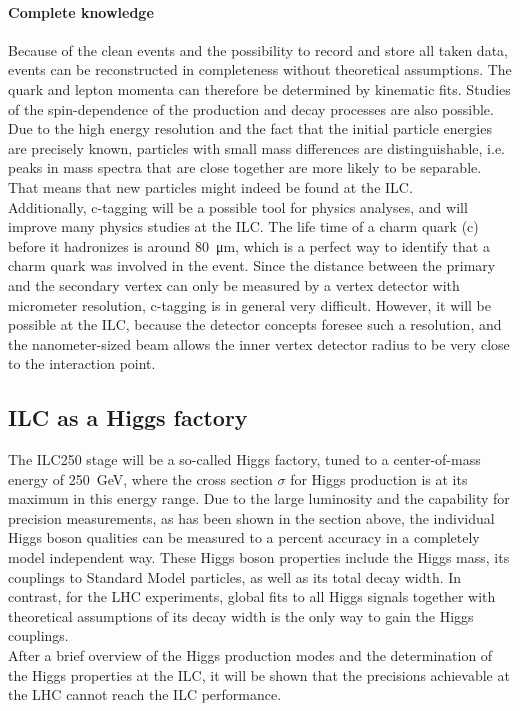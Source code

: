 \paragraph{Complete knowledge}
Because of the clean events and the possibility to record and store all taken data, events can be reconstructed in completeness without theoretical assumptions.
The quark and lepton momenta can therefore be determined by kinematic fits.
Studies of the spin-dependence of the production and decay processes are also possible.\\
Due to the high energy resolution and the fact that the initial particle energies are precisely known, particles with small mass differences are distinguishable, i.e. peaks in mass spectra that are close together are more likely to be separable.
That means that new particles might indeed be found at the ILC.\\
Additionally, c-tagging will be a possible tool for physics analyses, and will improve many physics studies at the ILC.
The life time of a charm quark (c) before it hadronizes is around \SI{80}{\micro\meter}, which is a perfect way to identify that a charm quark was involved in the event.
Since the distance between the primary and the secondary vertex can only be measured by a vertex detector with micrometer resolution, c-tagging is in general very difficult.
However, it will be possible at the ILC, because the detector concepts foresee such a resolution, and the nanometer-sized beam allows the inner vertex detector radius to be very close to the interaction point. 

\subsection{ILC as a Higgs factory}
The ILC250 stage will be a so-called Higgs factory, tuned to a center-of-mass energy of \SI{250}{\GeV}, where the cross section $\sigma$ for Higgs production is at its maximum in this energy range.
Due to the large luminosity and the capability for precision measurements, as has been shown in the section above, the individual Higgs boson qualities can be measured to a percent accuracy in a completely model independent way.
These Higgs boson properties include the Higgs mass, its couplings to Standard Model particles, as well as its total decay width.
In contrast, for the LHC experiments, global fits to all Higgs signals together with theoretical assumptions of its decay width is the only way to gain the Higgs couplings.
\\After a brief overview of the Higgs production modes and the determination of the Higgs properties at the ILC, it will be shown that the precisions achievable at the LHC cannot reach the ILC performance.

